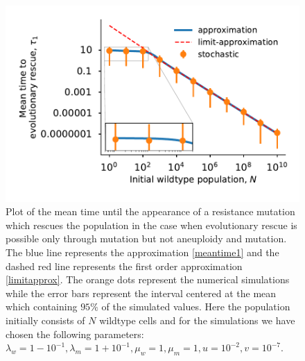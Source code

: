 \documentclass[12pt]{extarticle}
\begin{document}
\begin{figure}[!h]
 \vspace*{1\baselineskip}
\includegraphics[width=1\textwidth]{Figures/MeanTimeGrowthMutantDirectPlot.pdf}
\caption{Plot of the mean time until the appearance of a resistance mutation which rescues the population in the case when evolutionary rescue is possible only through mutation but not aneuploidy and mutation.  The blue line represents the approximation \eqref{meantime1} and the dashed red line represents the first order approximation \eqref{limitapprox}. The orange dots represent the numerical simulations while the error bars represent the interval centered at the mean which containing $95\%$ of the simulated values. Here the population initially consists of $N$ wildtype cells and for the simulations we have chosen the following parameters: $\lambda_w=1-10^{-1},\lambda_m=1+10^{-1},\mu_w=1,\mu_m=1,u=10^{-2},v=10^{-7}$.}
\label{MeanTimeGrowthAneuploidyPlot}
\end{figure}
\end{document}
